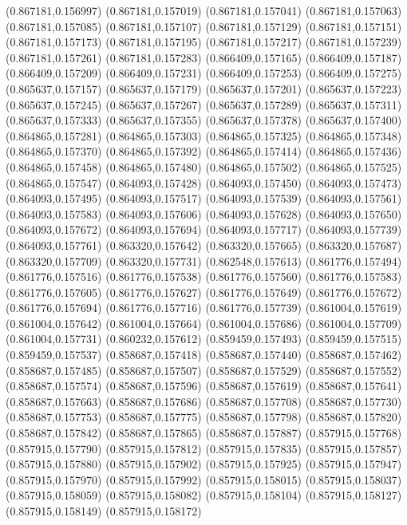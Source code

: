 (0.867181,0.156997)
(0.867181,0.157019)
(0.867181,0.157041)
(0.867181,0.157063)
(0.867181,0.157085)
(0.867181,0.157107)
(0.867181,0.157129)
(0.867181,0.157151)
(0.867181,0.157173)
(0.867181,0.157195)
(0.867181,0.157217)
(0.867181,0.157239)
(0.867181,0.157261)
(0.867181,0.157283)
(0.866409,0.157165)
(0.866409,0.157187)
(0.866409,0.157209)
(0.866409,0.157231)
(0.866409,0.157253)
(0.866409,0.157275)
(0.865637,0.157157)
(0.865637,0.157179)
(0.865637,0.157201)
(0.865637,0.157223)
(0.865637,0.157245)
(0.865637,0.157267)
(0.865637,0.157289)
(0.865637,0.157311)
(0.865637,0.157333)
(0.865637,0.157355)
(0.865637,0.157378)
(0.865637,0.157400)
(0.864865,0.157281)
(0.864865,0.157303)
(0.864865,0.157325)
(0.864865,0.157348)
(0.864865,0.157370)
(0.864865,0.157392)
(0.864865,0.157414)
(0.864865,0.157436)
(0.864865,0.157458)
(0.864865,0.157480)
(0.864865,0.157502)
(0.864865,0.157525)
(0.864865,0.157547)
(0.864093,0.157428)
(0.864093,0.157450)
(0.864093,0.157473)
(0.864093,0.157495)
(0.864093,0.157517)
(0.864093,0.157539)
(0.864093,0.157561)
(0.864093,0.157583)
(0.864093,0.157606)
(0.864093,0.157628)
(0.864093,0.157650)
(0.864093,0.157672)
(0.864093,0.157694)
(0.864093,0.157717)
(0.864093,0.157739)
(0.864093,0.157761)
(0.863320,0.157642)
(0.863320,0.157665)
(0.863320,0.157687)
(0.863320,0.157709)
(0.863320,0.157731)
(0.862548,0.157613)
(0.861776,0.157494)
(0.861776,0.157516)
(0.861776,0.157538)
(0.861776,0.157560)
(0.861776,0.157583)
(0.861776,0.157605)
(0.861776,0.157627)
(0.861776,0.157649)
(0.861776,0.157672)
(0.861776,0.157694)
(0.861776,0.157716)
(0.861776,0.157739)
(0.861004,0.157619)
(0.861004,0.157642)
(0.861004,0.157664)
(0.861004,0.157686)
(0.861004,0.157709)
(0.861004,0.157731)
(0.860232,0.157612)
(0.859459,0.157493)
(0.859459,0.157515)
(0.859459,0.157537)
(0.858687,0.157418)
(0.858687,0.157440)
(0.858687,0.157462)
(0.858687,0.157485)
(0.858687,0.157507)
(0.858687,0.157529)
(0.858687,0.157552)
(0.858687,0.157574)
(0.858687,0.157596)
(0.858687,0.157619)
(0.858687,0.157641)
(0.858687,0.157663)
(0.858687,0.157686)
(0.858687,0.157708)
(0.858687,0.157730)
(0.858687,0.157753)
(0.858687,0.157775)
(0.858687,0.157798)
(0.858687,0.157820)
(0.858687,0.157842)
(0.858687,0.157865)
(0.858687,0.157887)
(0.857915,0.157768)
(0.857915,0.157790)
(0.857915,0.157812)
(0.857915,0.157835)
(0.857915,0.157857)
(0.857915,0.157880)
(0.857915,0.157902)
(0.857915,0.157925)
(0.857915,0.157947)
(0.857915,0.157970)
(0.857915,0.157992)
(0.857915,0.158015)
(0.857915,0.158037)
(0.857915,0.158059)
(0.857915,0.158082)
(0.857915,0.158104)
(0.857915,0.158127)
(0.857915,0.158149)
(0.857915,0.158172)
